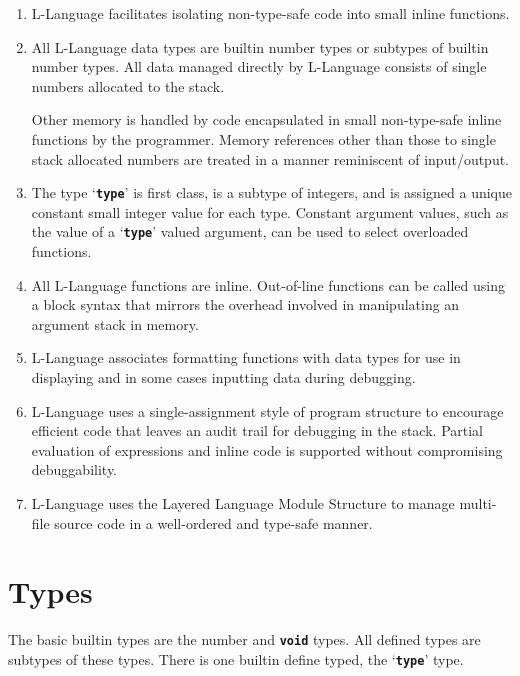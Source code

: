 \documentclass[12pt]{article}
\newcommand{\TT}[1]{{\tt \bfseries #1}}
\begin{document}
\begin{enumerate}

\item
L-Language facilitates isolating non-type-safe code into small inline functions.

\item
All L-Language data types are builtin number types or subtypes of
builtin number types.  All data managed directly by L-Language consists
of single numbers allocated to the stack.

Other memory is handled by code
encapsulated in small non-type-safe inline functions by the programmer.
Memory references other than those to single stack allocated numbers
are treated in a manner reminiscent of input/output.

\item
The type `\TT{type}' is first class, is a subtype of integers, and
is assigned a unique constant small integer value for each type.  Constant
argument values, such as the value of a `\TT{type}' valued
argument, can be used to select overloaded functions.

\item
All L-Language functions are inline.  Out-of-line functions can be
called using a block syntax that mirrors the overhead involved in
manipulating an argument stack in memory.

\item
L-Language associates formatting functions
with data types for use in displaying and in some cases inputting
data during debugging.

\item
L-Language uses a single-assignment style of program structure
to encourage
efficient code that leaves an audit trail for debugging in the stack.
Partial evaluation of expressions and inline code is supported without
compromising debuggability.

\item
L-Language uses the Layered Language Module Structure to manage
multi-file source code in a well-ordered and type-safe manner.


\end{enumerate}


\section{Types}
\label{TYPES}

The basic builtin types are the number and \TT{void} types.
All defined types are subtypes of these types.
There is one builtin define typed, the `\TT{type}' type.
\end{document}

